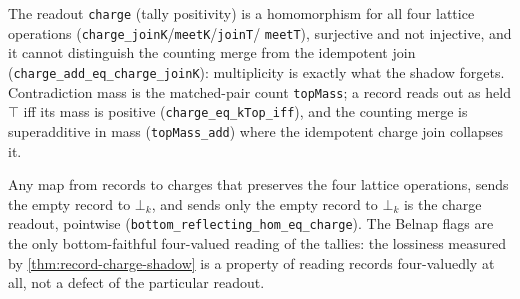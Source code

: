 \begin{theorem}\label{thm:record-charge-shadow}\leanok{}
The readout \texttt{charge} (tally positivity) is a homomorphism for all four
lattice operations (\texttt{charge\_joinK}/\texttt{meetK}/\texttt{joinT}/%
\texttt{meetT}), surjective and not injective, and it cannot distinguish the
counting merge from the idempotent join
(\texttt{charge\_add\_eq\_charge\_joinK}): multiplicity is exactly what the
shadow forgets. Contradiction mass is the matched-pair count
\texttt{topMass}; a record reads out as held $\top$ iff its mass is positive
(\texttt{charge\_eq\_kTop\_iff}), and the counting merge is superadditive in
mass (\texttt{topMass\_add}) where the idempotent charge join collapses it.
\end{theorem}

\begin{theorem}\label{thm:record-collapse-forced}\leanok{}
Any map from records to charges that preserves the four lattice operations,
sends the empty record to $\bot_k$, and sends only the empty record to
$\bot_k$ is the charge readout, pointwise
(\texttt{bottom\_reflecting\_hom\_eq\_charge}). The Belnap flags are the only
bottom-faithful four-valued reading of the tallies: the lossiness measured by
\ref{thm:record-charge-shadow} is a property of reading records four-valuedly
at all, not a defect of the particular readout.
\end{theorem}

